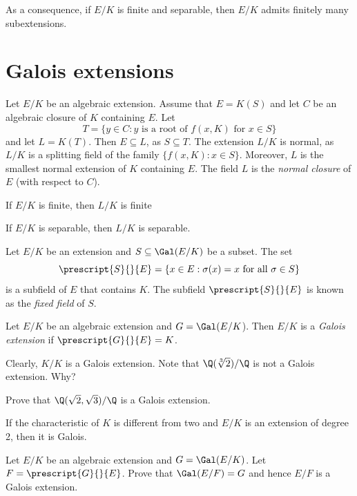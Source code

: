 As a consequence, if $E/K$ is finite and separable, then $E/K$ admits
finitely many subextensions. 

\section{Galois extensions}

Let $E/K$ be an algebraic extension. Assume that $E=K(S)$ and
let $C$ be an algebraic closure of $K$ containing $E$. Let 
\[
T=\{y\in C:y\text{ is a root of $f(x,K)$ for $x\in S$}\}
\]
and let $L=K(T)$. Then $E\subseteq L$, as $S\subseteq T$. The extension
$L/K$ is normal, as $L/K$ is a splitting field of the family $\{f(x,K):x\in S\}$. 
Moreover, $L$ is the smallest normal extension of $K$ containing $E$. The field
$L$ is the \emph{normal closure} of $E$ (with respect to $C$). 

\begin{exercise}
If $E/K$ is finite, then $L/K$ is finite
\end{exercise}

\begin{exercise}
If $E/K$ is separable, then $L/K$ is separable.
\end{exercise}

Let $E/K$ be an extension and $S\subseteq\Gal(E/K)$ be a subset. 
The set 
\[
    \prescript{S}{}{E}=\{x\in E:\sigma(x)=x\text{ for all $\sigma\in S$}\}
\]
is a subfield of $E$ that contains $K$. The subfield $\prescript{S}{}{E}$
is known as the \emph{fixed field} of $S$. 

\begin{definition}
    Let $E/K$ be an algebraic extension and $G=\Gal(E/K$). 
    Then $E/K$ is a \emph{Galois extension} if $\prescript{G}{}{E}=K$. 
\end{definition}

Clearly, $K/K$ is a Galois extension. 
Note that $\Q(\sqrt[3]{2})/\Q$ is not a Galois extension. Why?

\begin{exercise}
    Prove that $\Q(\sqrt{2},\sqrt{3})/\Q$ is a Galois extension. 
\end{exercise}

\begin{exercise}
If the characteristic of $K$ is different from two and $E/K$ is an extension of degree 2, then it is Galois. 
\end{exercise}

\begin{exercise}
    Let $E/K$ be an algebraic extension and $G=\Gal(E/K)$. Let
    $F=\prescript{G}{}{E}$. Prove that $\Gal(E/F)=G$ and hence $E/F$ is a Galois extension. 
\end{exercise}

